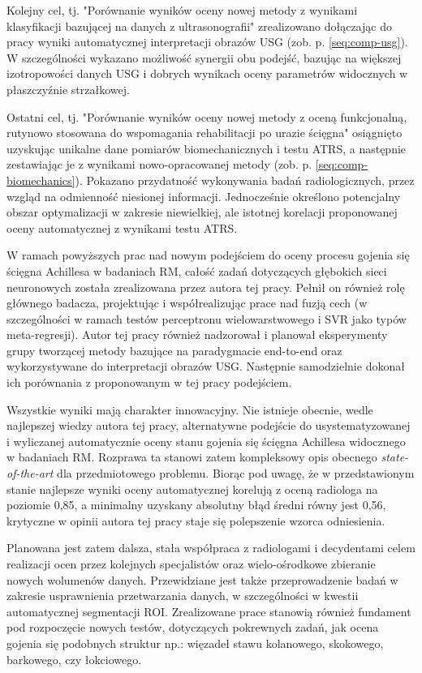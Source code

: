 Kolejny cel, tj. "Porównanie wyników oceny nowej metody z wynikami klasyfikacji bazującej na danych z ultrasonografii" zrealizowano dołączając do pracy wyniki automatycznej interpretacji obrazów USG (zob. p. \ref{seq:comp-usg}). W szczególności wykazano możliwość synergii obu podejść, bazując na większej izotropowości danych USG i dobrych wynikach oceny parametrów widocznych w płaszczyźnie strzałkowej.

Ostatni cel, tj. "Porównanie wyników oceny nowej metody z oceną funkcjonalną, rutynowo stosowana do wspomagania rehabilitacji po urazie ścięgna" osiągnięto uzyskując unikalne dane pomiarów biomechanicznych i testu ATRS, a następnie zestawiając je z wynikami nowo-opracowanej metody (zob. p. \ref{seq:comp-biomechanics}). Pokazano przydatność wykonywania badań radiologicznych, przez wzgląd na odmienność niesionej informacji. Jednocześnie określono potencjalny obszar optymalizacji w zakresie niewielkiej, ale istotnej korelacji proponowanej oceny automatycznej z wynikami testu ATRS.  

W ramach powyższych prac nad nowym podejściem do oceny procesu gojenia się ścięgna Achillesa w badaniach RM, całość zadań dotyczących głębokich sieci neuronowych została zrealizowana przez autora tej pracy. Pełnił on również rolę głównego badacza, projektując i współrealizując prace nad fuzją cech (w szczególności w ramach testów perceptronu wielowarstwowego i SVR jako typów meta-regresji). Autor tej pracy również nadzorował i planował eksperymenty grupy tworzącej metody bazujące na paradygmacie end-to-end oraz wykorzystywane do interpretacji obrazów USG. Następnie samodzielnie dokonał ich porównania z proponowanym w tej pracy podejściem. 

Wszystkie wyniki mają charakter innowacyjny. Nie istnieje obecnie, wedle najlepszej wiedzy autora tej pracy, alternatywne podejście do usystematyzowanej i wyliczanej automatycznie oceny stanu gojenia się ścięgna Achillesa widocznego w badaniach RM. Rozprawa ta stanowi zatem kompleksowy opis obecnego \textit{state-of-the-art} dla przedmiotowego problemu. Biorąc pod uwagę, że w przedstawionym stanie najlepsze wyniki oceny automatycznej korelują z oceną radiologa na poziomie 0,85, a minimalny uzyskany absolutny błąd średni równy jest 0,56, krytyczne w opinii autora tej pracy staje się polepszenie wzorca odniesienia. 

Planowana jest zatem dalsza, stała współpraca z radiologami i decydentami celem realizacji ocen przez kolejnych specjalistów oraz wielo-ośrodkowe zbieranie nowych wolumenów danych. Przewidziane jest także przeprowadzenie badań w zakresie usprawnienia przetwarzania danych, w szczególności w kwestii automatycznej segmentacji ROI. Zrealizowane prace stanowią również fundament pod rozpoczęcie nowych testów, dotyczących pokrewnych zadań, jak ocena gojenia się podobnych struktur np.: więzadeł stawu kolanowego, skokowego, barkowego, czy łokciowego. 


